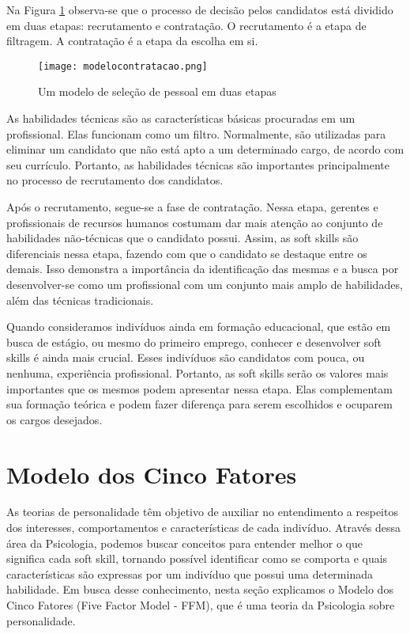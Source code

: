 Na Figura \ref{fig:modelocontratacao} observa-se que o processo de decisão pelos candidatos está dividido em duas etapas: recrutamento e contratação. O recrutamento é a etapa de filtragem. A contratação é a etapa da escolha em si.

\begin{figure}[h*]
\centering
\caption{\small Um modelo de seleção de pessoal em duas etapas}
\texttt{[image: modelocontratacao.png]}
\label{fig:modelocontratacao}
\end{figure}

As habilidades técnicas são as características básicas procuradas em um profissional. Elas funcionam como um filtro. Normalmente, são utilizadas para eliminar um candidato que não está apto a um determinado cargo, de acordo com seu currículo. Portanto, as habilidades técnicas são importantes principalmente no processo de recrutamento dos candidatos.

Após o recrutamento, segue-se a fase de contratação. Nessa etapa, gerentes e profissionais de recursos humanos costumam dar mais atenção ao conjunto de habilidades não-técnicas que o candidato possui. Assim, as soft skills são diferenciais nessa etapa, fazendo com que o candidato se destaque entre os demais. Isso demonstra a importância da identificação das mesmas e a busca por desenvolver-se como um profissional com um conjunto mais amplo de habilidades, além das técnicas tradicionais.

Quando consideramos indivíduos ainda em formação educacional, que estão em busca de estágio, ou mesmo do primeiro emprego, conhecer e desenvolver soft skills é ainda mais crucial. Esses indivíduos são candidatos com pouca, ou nenhuma, experiência profissional. Portanto, as soft skills serão os valores mais importantes que os mesmos podem apresentar nessa etapa. Elas complementam sua formação teórica e podem fazer diferença para serem escolhidos e ocuparem os cargos desejados.

\section{Modelo dos Cinco Fatores}
\label{sec:ffm}

As teorias de personalidade têm objetivo de auxiliar no entendimento a respeitos dos interesses, comportamentos e características de cada indivíduo. Através dessa área da Psicologia, podemos buscar conceitos para entender melhor o que significa cada soft skill, tornando possível identificar como se comporta e quais características são expressas por um indivíduo que possui uma determinada habilidade. Em busca desse conhecimento, nesta seção explicamos o Modelo dos Cinco Fatores (Five Factor Model - FFM), que é uma teoria da Psicologia sobre personalidade.

